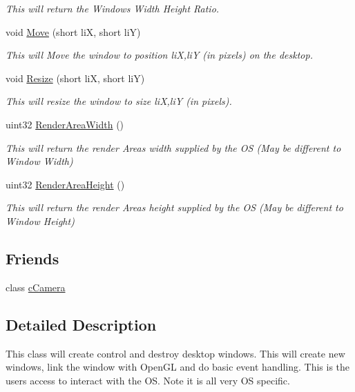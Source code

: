 \begin{DoxyCompactItemize}
\begin{DoxyCompactList}\small\item\em This will return the Windows Width Height Ratio. \end{DoxyCompactList}\item 
\hypertarget{classc_window_a11e2c0045091c6e6826361f8c68b2022}{
void \hyperlink{classc_window_a11e2c0045091c6e6826361f8c68b2022}{Move} (short liX, short liY)}
\label{classc_window_a11e2c0045091c6e6826361f8c68b2022}

\begin{DoxyCompactList}\small\item\em This will Move the window to position liX,liY (in pixels) on the desktop. \end{DoxyCompactList}\item 
\hypertarget{classc_window_a38129c91195b1e7f5711aecc1ffb4d77}{
void \hyperlink{classc_window_a38129c91195b1e7f5711aecc1ffb4d77}{Resize} (short liX, short liY)}
\label{classc_window_a38129c91195b1e7f5711aecc1ffb4d77}

\begin{DoxyCompactList}\small\item\em This will resize the window to size liX,liY (in pixels). \end{DoxyCompactList}\item 
\hypertarget{classc_window_a4930935cab62c77e3eca1daf6eff58bd}{
uint32 \hyperlink{classc_window_a4930935cab62c77e3eca1daf6eff58bd}{RenderAreaWidth} ()}
\label{classc_window_a4930935cab62c77e3eca1daf6eff58bd}

\begin{DoxyCompactList}\small\item\em This will return the render Areas width supplied by the OS (May be different to Window Width) \end{DoxyCompactList}\item 
\hypertarget{classc_window_afa0cbc2da583d467144875afd4caf368}{
uint32 \hyperlink{classc_window_afa0cbc2da583d467144875afd4caf368}{RenderAreaHeight} ()}
\label{classc_window_afa0cbc2da583d467144875afd4caf368}

\begin{DoxyCompactList}\small\item\em This will return the render Areas height supplied by the OS (May be different to Window Height) \end{DoxyCompactList}\end{DoxyCompactItemize}
\subsection*{Friends}
\begin{DoxyCompactItemize}
\item 
\hypertarget{classc_window_a930db2797d94f26b57e430e155ad81ba}{
class \hyperlink{classc_window_a930db2797d94f26b57e430e155ad81ba}{cCamera}}
\label{classc_window_a930db2797d94f26b57e430e155ad81ba}

\end{DoxyCompactItemize}


\subsection{Detailed Description}
This class will create control and destroy desktop windows. This will create new windows, link the window with OpenGL and do basic event handling. This is the users access to interact with the OS. Note it is all very OS specific. 